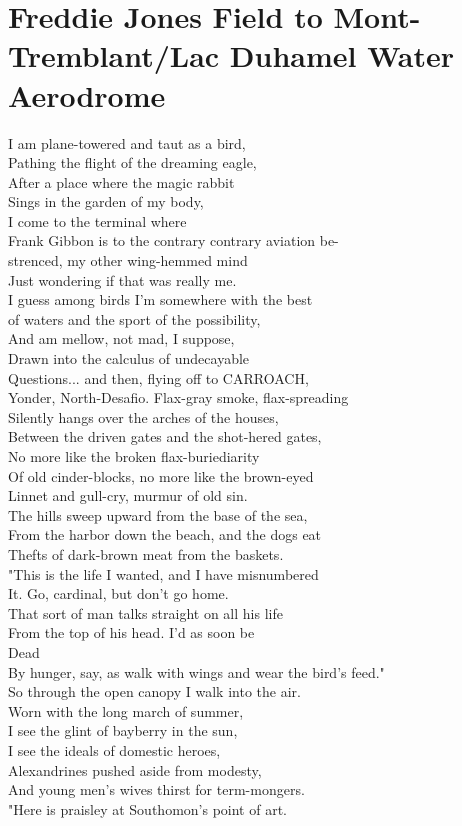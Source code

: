 \documentclass[smalldemyvopaper,11pt,twoside,onecolumn,openright,extrafontsizes]{memoir}
\begin{document}
\chapter{Freddie Jones Field to Mont-Tremblant/Lac Duhamel Water Aerodrome}
I am plane-towered and taut as a bird,
\\Pathing the flight of the dreaming eagle,
\\After a place where the magic rabbit
\\Sings in the garden of my body,
\\I come to the terminal where
\\Frank Gibbon is to the contrary contrary aviation be-
\\strenced, my other wing-hemmed mind
\\Just wondering if that was really me.
\\I guess among birds I'm somewhere with the best
\\of waters and the sport of the possibility,
\\And am mellow, not mad, I suppose,
\\Drawn into the calculus of undecayable
\\Questions... and then, flying off to CARROACH,
\\Yonder, North-Desafio. Flax-gray smoke, flax-spreading
\\Silently hangs over the arches of the houses,
\\Between the driven gates and the shot-hered gates,
\\No more like the broken flax-buriediarity
\\Of old cinder-blocks, no more like the brown-eyed
\\Linnet and gull-cry, murmur of old sin.
\\The hills sweep upward from the base of the sea,
\\From the harbor down the beach, and the dogs eat
\\Thefts of dark-brown meat from the baskets.
\\"This is the life I wanted, and I have misnumbered
\\It. Go, cardinal, but don't go home.
\\That sort of man talks straight on all his life
\\From the top of his head. I'd as soon be
\\Dead
\\By hunger, say, as walk with wings and wear the bird's feed."
\\So through the open canopy I walk into the air.
\\Worn with the long march of summer,
\\I see the glint of bayberry in the sun,
\\I see the ideals of domestic heroes,
\\Alexandrines pushed aside from modesty,
\\And young men's wives thirst for term-mongers.
\\"Here is praisley at Southomon's point of art.
\end{document}

